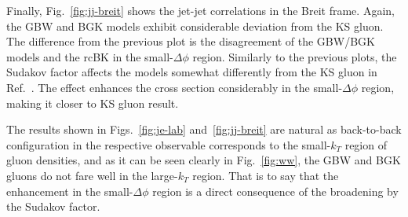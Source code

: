 \documentclass[11pt]{article}
\begin{document}
Finally, Fig.~\ref{fig:jj-breit} shows the jet-jet correlations in the Breit
frame. Again, the GBW and BGK models exhibit considerable deviation from the KS
gluon. The difference from the previous plot is the disagreement of the GBW/BGK
models and the rcBK in the small-$\Delta\phi$ region. Similarly to the previous
plots, the Sudakov factor affects the models somewhat differently from the KS
gluon in Ref.~\cite{vanHameren:2021sqc}.  The effect enhances the cross section
considerably in the small-$\Delta\phi$ region, making it closer to KS gluon
result.  

The results shown in Figs.~\ref{fig:je-lab} and~\ref{fig:jj-breit} are
natural as back-to-back configuration in the respective observable corresponds
to the small-$k_T$ region of gluon densities, and as it can be seen clearly in
Fig.~\ref{fig:ww}, the GBW and BGK gluons do not fare well in the large-$k_T$
region.  That is to say that the enhancement in the small-$\Delta\phi$ region is
a direct consequence of the broadening by the Sudakov factor. 
\end{document}
